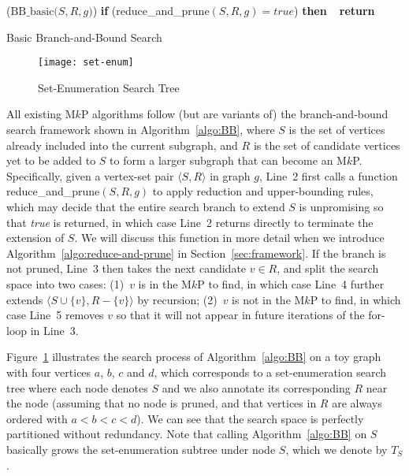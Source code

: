 \documentclass[sigconf, nonacm]{acmart}
\begin{document}
\begin{algorithm}[!h]
  \DontPrintSemicolon
  \Begin($\text{BB\_basic}{(}S, R, g{)}$){
    {\bf if} (reduce\_and\_prune$(S, R, g)=\textit{true}$) {\bf then\ \ return}\;\label{bb:l1}
      }
      \caption{Basic Branch-and-Bound Search}    
      \label{algo:BB}
    \end{algorithm}
\setlength{\textfloatsep}{0pt}

\begin{figure}[t]
\vspace{-4mm}
  \texttt{[image: set-enum]}
  \vspace{-2mm}
  \caption{Set-Enumeration Search Tree}\label{fig:set-enum}
\end{figure}
\setlength{\textfloatsep}{0pt}

\vspace{1mm}
All existing M$k$P algorithms follow (but are variants of) the branch-and-bound search framework shown in Algorithm~\ref{algo:BB}, where $S$ is the set of vertices already included into the current subgraph, and $R$ is the set of candidate vertices yet to be added to $S$ to form a larger subgraph that can become an M$k$P. 
Specifically, given a vertex-set pair $\langle S, R\rangle$ in graph $g$, Line~2 first calls a function reduce\_and\_prune$(S, R, g)$ to apply reduction and upper-bounding rules, which may decide that the entire search branch to extend $S$ is unpromising so that {\em true} is returned, in which case Line~2 returns directly to terminate the extension of $S$. We will discuss this function in more detail when we introduce Algorithm~\ref{algo:reduce-and-prune} in Section~\ref{sec:framework}. If the branch is not pruned, Line~3 then takes the next candidate $v\in R$, and split the search space into two cases: (1)~$v$ is in the M$k$P to find, in which case Line~4 further extends $\langle S\cup\{v\}, R-\{v\}\rangle$ by recursion; (2)~$v$ is not in the M$k$P to find, in which case Line~5 removes $v$ so that it will not appear in future iterations of the for-loop in Line~3.

Figure~\ref{fig:set-enum} illustrates the search process of Algorithm~\ref{algo:BB} on a toy graph with four vertices $a$, $b$, $c$ and $d$, which corresponds to a set-enumeration search tree where each node denotes $S$ and we also annotate its corresponding $R$ near the node (assuming that no node is pruned, and that vertices in $R$ are always ordered with $a<b<c<d$). We can see that the search space is perfectly partitioned without redundancy. Note that calling Algorithm~\ref{algo:BB} on $S$ basically grows the set-enumeration subtree under node $S$, which we denote by $T_S$.
\end{document}
